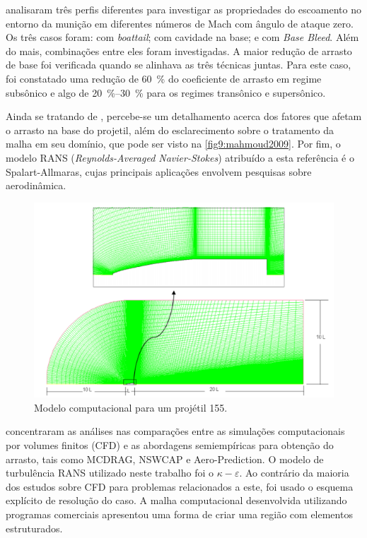 \cite{Mahmoud2009} analisaram três perfis diferentes para investigar as propriedades do escoamento no entorno da munição em diferentes números de Mach com ângulo de ataque zero. Os três casos foram: com \textit{boattail}; com cavidade na base; e com \textit{Base Bleed}. Além do mais, combinações entre eles foram investigadas. A maior redução de arrasto de base foi verificada quando se alinhava as três técnicas juntas. Para este caso, foi constatado uma redução de \qty{60}{\percent} do coeficiente de arrasto em regime subsônico e algo de \qtyrange{20}{30}{\percent} para os regimes transônico e supersônico. 
	
Ainda se tratando de \cite{Mahmoud2009}, percebe-se um detalhamento acerca dos fatores que afetam o arrasto na base do projetil, além do esclarecimento sobre o tratamento da malha em seu domínio, que pode ser visto na \autoref{fig9:mahmoud2009}. Por fim, o modelo RANS (\textit{Reynolds-Averaged Navier-Stokes}) atribuído a esta referência é o Spalart-Allmaras, cujas principais aplicações envolvem pesquisas sobre aerodinâmica.  

\begin{figure}[!ht]
	\centering
	\includegraphics[width=1.0\textwidth]{foto09-malha-mahmoud2009.png}
	\caption[Modelo computacional para um projétil \qty{155}{\millimetre}.]{Modelo computacional para um projétil \qty{155}{\millimetre}. \cite{Mahmoud2009}}
	\label{fig9:mahmoud2009}
\end{figure}

\cite{torangatti2basawaraj} concentraram as análises nas comparações entre as simulações computacionais por volumes finitos (CFD) e as abordagens semiempíricas para obtenção do arrasto, tais como MCDRAG, NSWCAP e Aero-Prediction. O modelo de turbulência RANS utilizado neste trabalho foi o \(\kappa-\varepsilon\). Ao contrário da maioria dos estudos sobre CFD para problemas relacionados a este, foi usado o esquema explícito de resolução do caso. A malha computacional desenvolvida utilizando programas comerciais apresentou uma forma de criar uma região com elementos estruturados.
	
